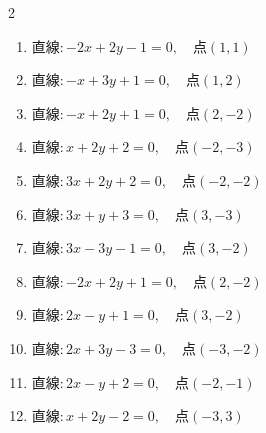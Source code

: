 \begin{multicols}{2}
\begin{enumerate}
  \item $直線:-2x+2y-1=0,\quad 点 ( 1, 1 )$


  \item $直線:-x+3y+1=0,\quad 点 ( 1, 2 )$


\columnbreak %

  \item $直線:-x+2y+1=0,\quad 点 ( 2, -2 )$


  \item $直線:x+2y+2=0,\quad 点 ( -2, -3 )$


  \item $直線:3x+2y+2=0,\quad 点 ( -2, -2 )$


  \item $直線:3x+y+3=0,\quad 点 ( 3, -3 )$


  \item $直線:3x-3y-1=0,\quad 点 ( 3, -2 )$


  \item $直線:-2x+2y+1=0,\quad 点 ( 2, -2 )$


  \item $直線:2x-y+1=0,\quad 点 ( 3, -2 )$


  \item $直線:2x+3y-3=0,\quad 点 ( -3, -2 )$


  \item $直線:2x-y+2=0,\quad 点 ( -2, -1 )$


  \item $直線:x+2y-2=0,\quad 点 ( -3, 3 )$


\end{enumerate}
\end{multicols}
